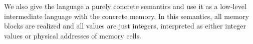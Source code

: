 We also give the language a purely concrete semantics and use it as a
low-level intermediate language with the concrete memory.  In this
semantics, all memory blocks are realized and all values are just
integers, interpreted as either integer values or physical addresses
of memory cells.



